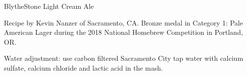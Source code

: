 \begin{recipe}{BlytheStone Light Cream Ale} %

\begin{aboutblock}
Recipe by Kevin Nanzer of Sacramento, CA. Bronze medal in Category 1: Pale American
Lager during the 2018 National Homebrew Competition in Portland, OR. \sourceaha
\end{aboutblock}


\begin{methodandtiming}

\begin{mashsteps}
\end{mashsteps}

\begin{fermentationsteps}
\end{fermentationsteps}

\begin{directions}
Water adjustment: use carbon filtered Sacramento City tap water with
 calcium sulfate,  calcium chloride and 
lactic acid in the mash.
\end{directions}

\end{methodandtiming}

\recipebreak

\begin{ingredientsblock}

\begin{malts}
\end{malts}

\begin{hops}
\end{hops}


\end{ingredientsblock}

\end{recipe}

